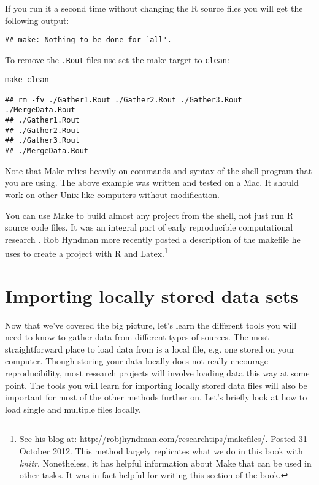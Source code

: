 \noindent If you run it a second time without changing the R source files you will get the following output:

\begin{knitrout}
	\color{fgcolor}
	\begin{kframe}
		\begin{verbatim}
## make: Nothing to be done for `all'.
			\end{verbatim}
		\end{kframe}
\end{knitrout}

To remove the \texttt{.Rout} files use set the make target to \texttt{clean}:

\begin{knitrout}
	\color{fgcolor}
	\begin{kframe}
		\begin{verbatim}
make clean

## rm -fv ./Gather1.Rout ./Gather2.Rout ./Gather3.Rout ./MergeData.Rout
## ./Gather1.Rout
## ./Gather2.Rout
## ./Gather3.Rout
## ./MergeData.Rout
			\end{verbatim}
		\end{kframe}
\end{knitrout}


Note that Make relies heavily on commands and syntax of the shell program that you are using. The above example was written and tested on a Mac. It should work on other Unix-like computers without modification.

You can use Make to build almost any project from the shell, not just run R source code files. It was an integral part of early reproducible computational research \citep{Fomel2009, Buckheit1995}. Rob Hyndman more recently posted a description of the makefile he uses to create a project with R and Latex.\footnote{See his blog at: \url{http://robjhyndman.com/researchtips/makefiles/}. Posted 31 October 2012. This method largely replicates what we do in this book with \emph{knitr}. Nonetheless, it has helpful information about Make that can be used in other tasks. It was in fact helpful for writing this section of the book.}

\section{Importing locally stored data sets}

Now that we've covered the big picture, let's learn the different tools you will need to know to gather data from different types of sources. The most straightforward place to load data from is a local file, e.g. one stored on your computer. Though storing your data locally does not really encourage reproducibility, most research projects will involve loading data this way at some point. The tools you will learn for importing locally stored data files will also be important for most of the other methods further on. Let's briefly look at how to load single and multiple files locally.

